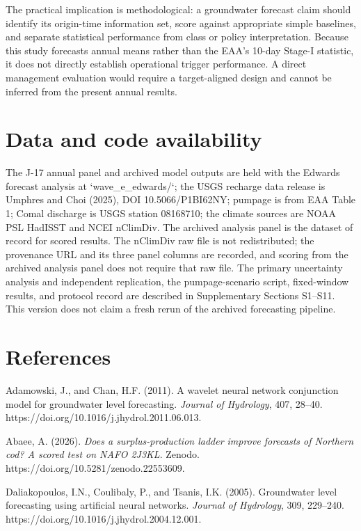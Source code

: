 \documentclass[11pt]{article}
\begin{document}
The practical implication is methodological: a groundwater forecast claim should identify its origin-time information set, score against appropriate simple baselines, and separate statistical performance from class or policy interpretation. Because this study forecasts annual means rather than the EAA's 10-day Stage-I statistic, it does not directly establish operational trigger performance. A direct management evaluation would require a target-aligned design and cannot be inferred from the present annual results.

\section*{Data and code availability}

The J-17 annual panel and archived model outputs are held with the Edwards forecast analysis at `wave\_e\_edwards/`; the USGS recharge data release is Umphres and Choi (2025), DOI 10.5066/P1BI62NY; pumpage is from EAA Table 1; Comal discharge is USGS station 08168710; the climate sources are NOAA PSL HadISST and NCEI nClimDiv. The archived analysis panel is the dataset of record for scored results. The nClimDiv raw file is not redistributed; the provenance URL and its three panel columns are recorded, and scoring from the archived analysis panel does not require that raw file. The primary uncertainty analysis and independent replication, the pumpage-scenario script, fixed-window results, and protocol record are described in Supplementary Sections S1--S11. This version does not claim a fresh rerun of the archived forecasting pipeline.

\section*{References}

Adamowski, J., and Chan, H.F. (2011). A wavelet neural network conjunction model for groundwater level forecasting. \emph{Journal of Hydrology}, 407, 28--40. https://doi.org/10.1016/j.jhydrol.2011.06.013.

Abaee, A. (2026). \emph{Does a surplus-production ladder improve forecasts of Northern cod? A scored test on NAFO 2J3KL}. Zenodo. https://doi.org/10.5281/zenodo.22553609.

Daliakopoulos, I.N., Coulibaly, P., and Tsanis, I.K. (2005). Groundwater level forecasting using artificial neural networks. \emph{Journal of Hydrology}, 309, 229--240. https://doi.org/10.1016/j.jhydrol.2004.12.001.
\end{document}
